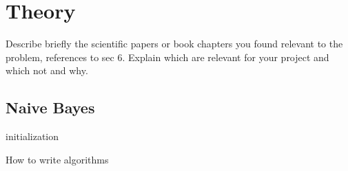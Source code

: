 \section{Theory}
Describe briefly the scientific papers or book chapters you found relevant to the problem, references to sec 6. Explain which are relevant for your project and which not and why.

\subsection{Naive Bayes}
\begin{algorithm}[h]
\label{algorithm:naive_bayes}
 \SetAlgoLined
 initialization\;
 \caption{How to write algorithms}
\end{algorithm}


